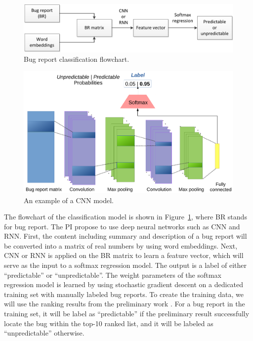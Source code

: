 \begin{figure}[!h]
\centering
\includegraphics[width=\columnwidth]{figures/classification.pdf}
\caption{Bug report classification flowchart.}
\label{fig:classification}
\end{figure}
\begin{figure}[!h]
\centering
\includegraphics[width=\columnwidth]{figures/cnn.pdf}
\caption{An example of a CNN model.}
\label{fig:cnn}
\end{figure}

The flowchart of the classification model is shown in Figure~\ref{fig:classification}, where BR stands for bug report. The PI propose to use deep neural networks such as CNN and RNN. First, the content including summary and description of a bug report will be converted into a matrix of real numbers by using word embeddings. Next, CNN or RNN is applied on the BR matrix to learn a feature vector, which will serve as the input to a softmax regression model. The output is a label of either ``predictable'' or ``unpredictable''. The weight parameters of the softmax regression model is learned by using stochastic gradient descent on a dedicated training set with manually labeled bug reports. To create the training data, we will use the ranking results from the preliminary work \cite{Ye:ICSE16}. For a bug report in the training set, it will be label as ``predictable'' if the preliminary result \cite{Ye:ICSE16} successfully locate the bug within the top-10 ranked list, and it will be labeled as ``unpredictable'' otherwise.


